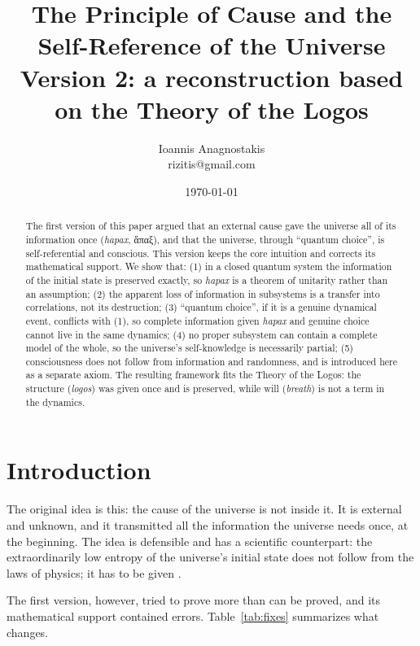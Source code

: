 \documentclass[a4paper,11pt]{article}
\title{The Principle of Cause and the Self-Reference of the Universe\\[4pt]
\large Version 2: a reconstruction based on the Theory of the Logos}
\author{Ioannis Anagnostakis \\ rizitis@gmail.com}
\date{\today}
\theoremstyle{definition}
\begin{document}
\maketitle

\begin{abstract}
The first version of this paper argued that an external cause gave the universe all of its information once (\emph{hapax}, ἅπαξ), and that the universe, through ``quantum choice'', is self-referential and conscious. This version keeps the core intuition and corrects its mathematical support. We show that: (1) in a closed quantum system the information of the initial state is preserved exactly, so \emph{hapax} is a theorem of unitarity rather than an assumption; (2) the apparent loss of information in subsystems is a transfer into correlations, not its destruction; (3) ``quantum choice'', if it is a genuine dynamical event, conflicts with (1), so complete information given \emph{hapax} and genuine choice cannot live in the same dynamics; (4) no proper subsystem can contain a complete model of the whole, so the universe's self-knowledge is necessarily partial; (5) consciousness does not follow from information and randomness, and is introduced here as a separate axiom. The resulting framework fits the Theory of the Logos: the structure (\emph{logos}) was given once and is preserved, while will (\emph{breath}) is not a term in the dynamics.
\end{abstract}

\section{Introduction}

The original idea is this: the cause of the universe is not inside it. It is external and unknown, and it transmitted all the information the universe needs once, at the beginning. The idea is defensible and has a scientific counterpart: the extraordinarily low entropy of the universe's initial state does not follow from the laws of physics; it has to be given \cite{penrose}.

The first version, however, tried to prove more than can be proved, and its mathematical support contained errors. Table~\ref{tab:fixes} summarizes what changes.
\end{document}
